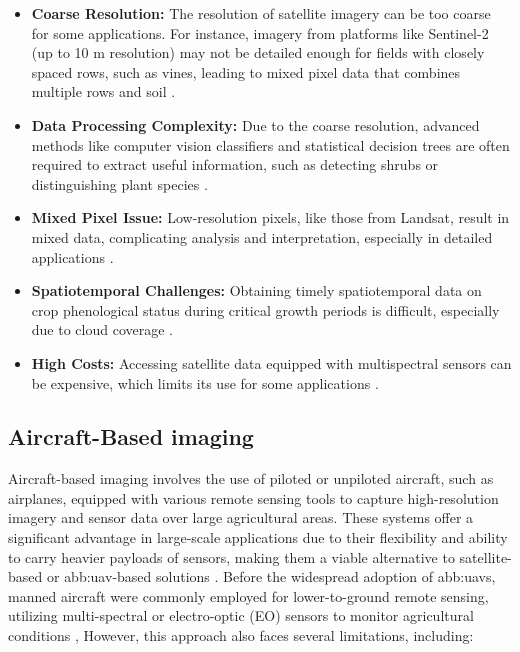 \begin{itemize}
    \item \textbf{Coarse Resolution:} The resolution of satellite imagery can be too coarse for some applications. For instance, imagery from platforms like Sentinel-2 (up to 10 m resolution) may not be detailed enough for fields with closely spaced rows, such as vines, leading to mixed pixel data that combines multiple rows and soil \parencite{adao2017hyperspectral}.
    
    \item \textbf{Data Processing Complexity:} Due to the coarse resolution, advanced methods like computer vision classifiers and statistical decision trees are often required to extract useful information, such as detecting shrubs or distinguishing plant species \parencite{phang2023from}.
    
    \item \textbf{Mixed Pixel Issue:} Low-resolution pixels, like those from Landsat, result in mixed data, complicating analysis and interpretation, especially in detailed applications \parencite{delavarpour2021technical}.
    
    \item \textbf{Spatiotemporal Challenges:} Obtaining timely spatiotemporal data on crop phenological status during critical growth periods is difficult, especially due to cloud coverage \parencite{delavarpour2021technical}.
    
    \item \textbf{High Costs:} Accessing satellite data equipped with multispectral sensors can be expensive, which limits its use for some applications \parencite{delavarpour2021technical}.
  \end{itemize}
  

\subsection{Aircraft-Based imaging}

Aircraft-based imaging involves the use of piloted or unpiloted aircraft, such as airplanes, equipped with various remote sensing tools to capture high-resolution imagery and sensor data over large agricultural areas. These systems offer a significant advantage in large-scale applications due to their flexibility and ability to carry heavier payloads of sensors, making them a viable alternative to satellite-based or \gls{abb:uav}-based solutions \parencite{delavarpour2021technical}.
Before the widespread adoption of \gls{abb:uav}s, manned aircraft were commonly employed for lower-to-ground remote sensing, utilizing multi-spectral or electro-optic (EO) sensors to monitor agricultural conditions \parencite{phang2023satellite}, However, this approach also faces several limitations, including:

